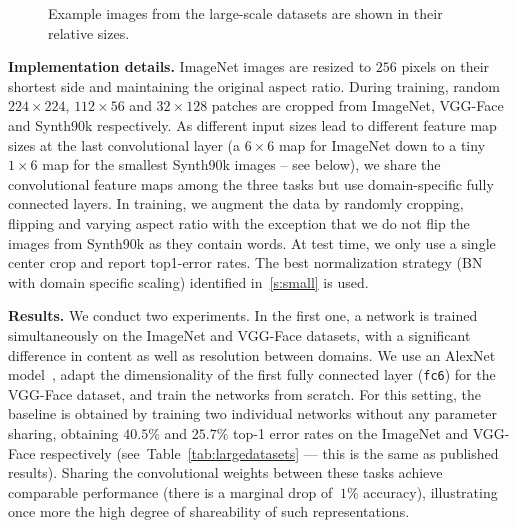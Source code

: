 \documentclass[10pt,twocolumn,letterpaper]{article}
\renewcommand{\paragraph}[1]{\par\medskip\noindent\textbf{#1}}
\begin{document}
\begin{figure}
\centering
{}
  \caption{Example images from the large-scale datasets are shown in their relative sizes.}
 \label{tab:samples-large}
\end{figure}
  
 
\paragraph{Implementation details.} ImageNet images are resized to $256$ pixels on their shortest side and maintaining the original aspect ratio. During training, random $224\times224$, $112\times56$ and $32\times128$ patches are cropped from ImageNet, VGG-Face and Synth90k  respectively. As different input sizes lead to different feature map sizes at the last convolutional layer (a $6\times 6$ map for ImageNet down to a tiny $1 \times 6$ map for the smallest Synth90k images -- see below), we share the convolutional feature maps among the three tasks but use domain-specific fully connected layers. In training, we augment the data by randomly cropping, flipping and varying aspect ratio with the exception that we do not flip the images from Synth90k as they contain words. At test time, we only use a single center crop and report top1-error rates. The best normalization strategy (BN with domain specific scaling) identified in~\ref{s:small} is used.

\paragraph{Results.} We conduct two experiments. In the first one, a network is trained simultaneously on the ImageNet and VGG-Face datasets, with a significant difference in content as well as resolution between domains. We use an AlexNet model~\cite{krizhevsky12imagenet}, adapt the dimensionality of the first fully connected layer (\texttt{fc6}) for the VGG-Face dataset, and train the networks from scratch. For this setting, the baseline is obtained by training two individual networks without any parameter sharing, obtaining $40.5\%$ and $25.7\%$ top-1 error rates on the ImageNet and VGG-Face respectively (see~Table~\ref{tab:largedatasets} --- this is the same as published results). Sharing the convolutional weights between these tasks achieve comparable performance (there is a marginal drop of $~1\%$ accuracy), illustrating once more the high degree of shareability of such representations.
\end{document}
